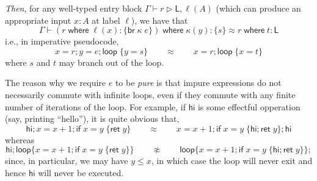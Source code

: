 \documentclass[acmsmall,screen,review]{acmart}
\newcommand{\ms}[1]{\ensuremath{\mathsf{#1}}}
\newcommand{\lto}{:}
\newcommand{\brb}[2]{\ms{br}\;#1\;#2}
\newcommand{\where}[2]{#1\;\ms{where}\;#2}
\newcommand{\wbranch}[3]{#1(#2) \lto \{#3\}}
\newcommand{\haslb}[3]{#1 \vdash #2 \rhd #3}
\newcommand{\teqv}{\approx}
\newcommand{\lbeq}[4]{#1 \vdash #2 \teqv #3 : {#4}}
\begin{document}
\emph{Then}, for any well-typed entry block $\haslb{\Gamma}{r}{\ms{L}, \ell(A)}$ (which can produce
an appropriate input $x : A$ at label $\ell$), we have that
$$
  \lbeq{\Gamma}{\where{(\where{r}{\wbranch{\ell}{x}{\brb{\kappa}{e}}})}
    {\wbranch{\kappa}{y}{s}}}{\where{r}{t}}{\ms{L}}
$$
i.e., in imperative pseudocode,
$$
  x = r; y = e; \ms{loop}\;\{ y = s \} \qquad \teqv \qquad x = r; \ms{loop}\;\{ x = t \}
$$
where $s$ and $t$ may branch out of the loop.

The reason why we require $e$ to be \emph{pure} is that impure expressions do not necessarily
commute with infinite loops, even if they commute with any finite number of iterations of the loop.
For example, if $\ms{hi}$ is some effectful opperation (say, printing ``hello''), it is quite
obvious that,
$$
  \ms{hi} ; x = x + 1 ; \ms{if}\;x = y\;\{\ms{ret}\;y\}
  \qquad \teqv \qquad 
  x = x + 1 
  ; \ms{if}\;x = y\;\{\ms{hi} ; \ms{ret}\;y\} 
  ;  \ms{hi}
$$
whereas
$$
  \ms{hi} ; \ms{loop} \{ x = x + 1 ; \ms{if}\;x = y\;\{\ms{ret}\;y\} \} 
  \qquad \not\teqv \qquad 
  \ms{loop} \{ x = x + 1 ;  \ms{if}\;x = y\;\{\ms{hi} ; \ms{ret}\;y\} \} ;
$$
since, in particular, we may have $y \leq x$, in which case the loop will never exit and hence
$\ms{hi}$ will never be executed.
\end{document}

